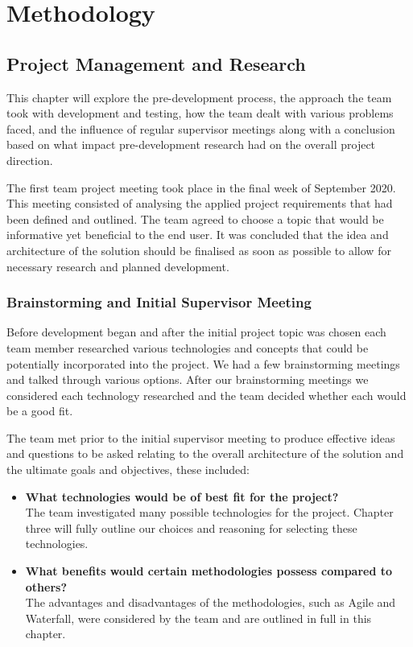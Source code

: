 \chapter{Methodology}
\section{Project Management and Research}
This chapter will explore the pre-development process, the approach the team took with development and testing, how the team dealt with various problems faced, and the influence of regular supervisor meetings along with a conclusion based on what impact pre-development research had on the overall project direction.

\vspace{5mm} %

The first team project meeting took place in the final week of September 2020. This meeting consisted of analysing the applied project requirements that had been defined and outlined. The team agreed to choose a topic that would be informative yet beneficial to the end user. It was concluded that the idea and architecture of the solution should be finalised as soon as possible to allow for necessary research and planned development.


\subsection{Brainstorming and Initial Supervisor Meeting}
Before development began and after the initial project topic was chosen each team member researched various technologies and concepts that could be potentially incorporated into the project. We had a few brainstorming meetings and talked through various options. After our brainstorming meetings we  considered each technology researched and the team decided whether each would be a good fit.

\vspace{5mm} %

The team met prior to the initial supervisor meeting to produce effective ideas and questions to be asked relating to the overall architecture of the solution and the ultimate goals and objectives, these included:
\vspace{5mm} %

\begin{itemize}


    \item \textbf{What technologies would be of best fit for the project?} \\
The team investigated many possible technologies for the project. Chapter three will fully outline our choices and reasoning for selecting these technologies.

    \item \textbf{What benefits would certain methodologies possess compared to others?}\\
The advantages and disadvantages of the methodologies, such as Agile and Waterfall, were considered by the team and are outlined in full in this chapter.
\end{itemize}

